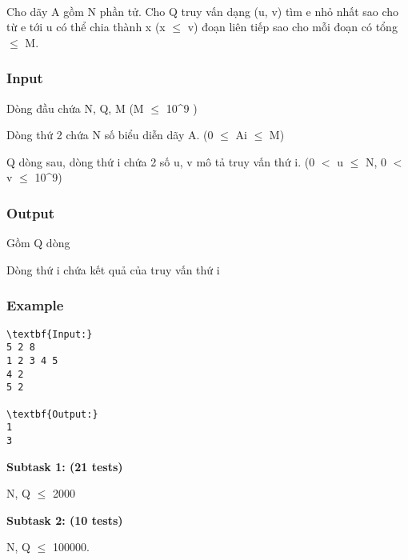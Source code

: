

 

Cho dãy A gồm N phần tử. Cho Q truy vấn dạng (u, v) tìm e nhỏ nhất sao cho từ e tới u có thể chia thành x (x  $\le$  v) đoạn liên tiếp sao cho mỗi đoạn có tổng  $\le$  M.

\subsubsection{Input}

Dòng đầu chứa N, Q, M (M  $\le$  10\textasciicircum9 )

Dòng thứ 2 chứa N số biểu diễn dãy A. (0  $\le$  Ai  $\le$  M)

Q dòng sau, dòng thứ i chứa 2 số u, v mô tả truy vấn thứ i. (0 $<$ u  $\le$  N, 0 $<$ v  $\le$  10\textasciicircum9)

\subsubsection{Output}

Gồm Q dòng

Dòng thứ i chứa kết quả của truy vấn thứ i

\subsubsection{Example}
\begin{verbatim}
\textbf{Input:}
5 2 8
1 2 3 4 5
4 2
5 2

\textbf{Output:}
1
3\end{verbatim}

\textbf{Subtask 1: (21 tests) }

N, Q  $\le$  2000

\textbf{Subtask 2: (10 tests) }

N, Q  $\le$  100000.

 
